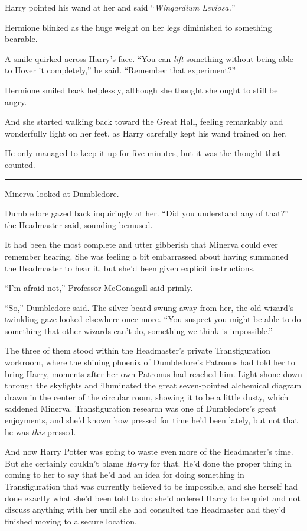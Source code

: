Harry pointed his wand at her and said ``\emph{Wingardium Leviosa.}''

Hermione blinked as the huge weight on her legs diminished to something bearable.

A smile quirked across Harry's face. ``You can \emph{lift} something without being able to Hover it completely,'' he said. ``Remember that experiment?''

Hermione smiled back helplessly, although she thought she ought to still be angry.

And she started walking back toward the Great Hall, feeling remarkably and wonderfully light on her feet, as Harry carefully kept his wand trained on her.

He only managed to keep it up for five minutes, but it was the thought that counted.

\begin{center}\rule{3in}{0.4pt}\end{center}

Minerva looked at Dumbledore.

Dumbledore gazed back inquiringly at her. ``Did you understand any of that?'' the Headmaster said, sounding bemused.

It had been the most complete and utter gibberish that Minerva could ever remember hearing. She was feeling a bit embarrassed about having summoned the Headmaster to hear it, but she'd been given explicit instructions.

``I'm afraid not,'' Professor McGonagall said primly.

``So,'' Dumbledore said. The silver beard swung away from her, the old wizard's twinkling gaze looked elsewhere once more. ``You suspect you might be able to do something that other wizards can't do, something we think is impossible.''

The three of them stood within the Headmaster's private Transfiguration workroom, where the shining phoenix of Dumbledore's Patronus had told her to bring Harry, moments after her own Patronus had reached him. Light shone down through the skylights and illuminated the great seven-pointed alchemical diagram drawn in the center of the circular room, showing it to be a little dusty, which saddened Minerva. Transfiguration research was one of Dumbledore's great enjoyments, and she'd known how pressed for time he'd been lately, but not that he was \emph{this} pressed.

And now Harry Potter was going to waste even more of the Headmaster's time. But she certainly couldn't blame \emph{Harry} for that. He'd done the proper thing in coming to her to say that he'd had an idea for doing something in Transfiguration that was currently believed to be impossible, and she herself had done exactly what she'd been told to do: she'd ordered Harry to be quiet and not discuss anything with her until she had consulted the Headmaster and they'd finished moving to a secure location.

